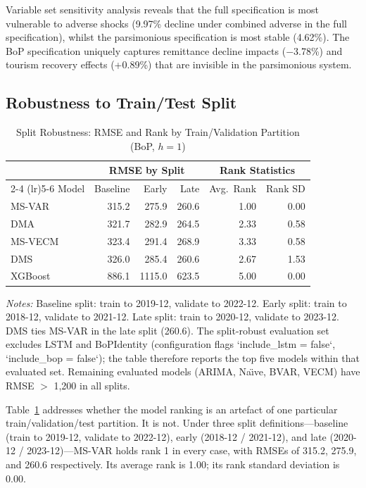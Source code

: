 \documentclass[12pt,a4paper]{article}
\begin{document}
Variable set sensitivity analysis reveals that the full specification is most vulnerable to adverse shocks (9.97\% decline under combined adverse in the full specification), whilst the parsimonious specification is most stable (4.62\%). The BoP specification uniquely captures remittance decline impacts ($-$3.78\%) and tourism recovery effects (+0.89\%) that are invisible in the parsimonious system.

\subsection{Robustness to Train/Test Split}

\begin{table}[htbp]
\centering
\caption{Split Robustness: RMSE and Rank by Train/Validation Partition (BoP, $h=1$)}
\label{tab:split_robustness}
\begin{tabular}{lrrr|rr}
\toprule
& \multicolumn{3}{c}{RMSE by Split} & \multicolumn{2}{c}{Rank Statistics} \\
\cmidrule(lr){2-4} \cmidrule(lr){5-6}
Model & Baseline & Early & Late & Avg.\ Rank & Rank SD \\
\midrule
MS-VAR & 315.2 & 275.9 & 260.6 & 1.00 & 0.00 \\
DMA & 321.7 & 282.9 & 264.5 & 2.33 & 0.58 \\
MS-VECM & 323.4 & 291.4 & 268.9 & 3.33 & 0.58 \\
DMS & 326.0 & 285.4 & 260.6 & 2.67 & 1.53 \\
XGBoost & 886.1 & 1115.0 & 623.5 & 5.00 & 0.00 \\
\bottomrule
\end{tabular}
\begin{tablenotes}
\small
\item \textit{Notes:} Baseline split: train to 2019-12, validate to 2022-12. Early split: train to 2018-12, validate to 2021-12. Late split: train to 2020-12, validate to 2023-12. DMS ties MS-VAR in the late split (260.6). The split-robust evaluation set excludes LSTM and BoPIdentity (configuration flags `include\_lstm = false`, `include\_bop = false`); the table therefore reports the top five models within that evaluated set. Remaining evaluated models (ARIMA, Na\"{\i}ve, BVAR, VECM) have RMSE $>$ 1,200 in all splits.
\end{tablenotes}
\end{table}

Table~\ref{tab:split_robustness} addresses whether the model ranking is an artefact of one particular train/validation/test partition. It is not. Under three split definitions---baseline (train to 2019-12, validate to 2022-12), early (2018-12 / 2021-12), and late (2020-12 / 2023-12)---MS-VAR holds rank 1 in every case, with RMSEs of 315.2, 275.9, and 260.6 respectively. Its average rank is 1.00; its rank standard deviation is 0.00.
\end{document}
